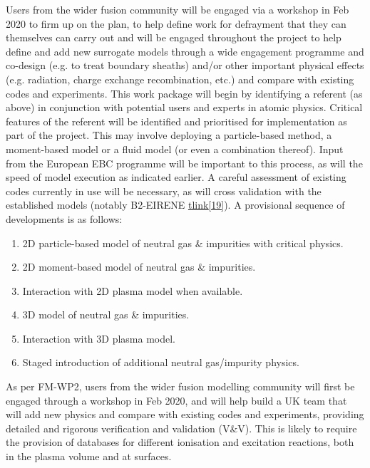 Users from the wider fusion community will be engaged via a workshop in Feb 
2020 to firm up on the plan, to help define
work for defrayment that they can themselves can carry out and will be engaged 
throughout the project to help define
and add new surrogate models through a wide engagement programme and co-design 
(e.g. to treat boundary sheaths) and/or
other important physical effects (e.g. radiation, charge exchange 
recombination, etc.) and compare with existing codes
and experiments. 
This work package will begin by identifying a referent (as above) in 
conjunction with potential users and experts in
atomic physics. Critical features of the referent will be identified and 
prioritised for implementation as part of the
project. This may involve deploying a particle-based method, a moment-based 
model or a fluid model (or even a
combination thereof). Input from the European EBC programme will be important 
to this process, as will the speed of
model execution as indicated earlier. A careful assessment of existing codes 
currently in use {will be
necessary, as will cross validation with the established models (notably 
B2-EIRENE
}\href{https://www.tandfonline.com/doi/abs/10.13182/FST47-172}{\textstyleInterne
tlink{{[19]}}}{).
A provisional }sequence of developments is as follows:


\bigskip

\liststyleWWNumxi
\begin{enumerate}
\item 2D particle-based model of neutral gas \& impurities with critical physics.
\item 2D moment-based model of neutral gas \& impurities.
\item Interaction with 2D plasma model when available.
\item 3D model of neutral gas \& impurities.
\item Interaction with 3D plasma model.
\item Staged introduction of additional neutral gas/impurity physics.
\end{enumerate}

\bigskip

As per FM-WP2, users from the wider fusion modelling community will first be 
engaged through a workshop in Feb 2020, and
will help build a UK team that will add new physics and compare with existing 
codes and experiments, providing detailed
and rigorous verification and validation (V\&V). This is likely to require the 
provision of databases for different
ionisation and excitation reactions, both in the plasma volume and at surfaces.
